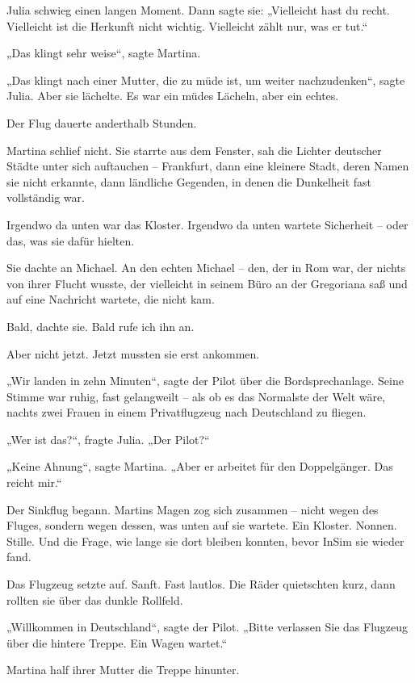 \documentclass[
]{article}
\begin{document}
Julia schwieg einen langen Moment. Dann sagte sie: „Vielleicht hast du recht. Vielleicht ist die Herkunft nicht wichtig. Vielleicht zählt nur, was er tut.``

„Das klingt sehr weise``, sagte Martina.

„Das klingt nach einer Mutter, die zu müde ist, um weiter nachzudenken``, sagte Julia. Aber sie lächelte. Es war ein müdes Lächeln, aber ein echtes.

Der Flug dauerte anderthalb Stunden.

Martina schlief nicht. Sie starrte aus dem Fenster, sah die Lichter deutscher Städte unter sich auftauchen -- Frankfurt, dann eine kleinere Stadt, deren Namen sie nicht erkannte, dann ländliche Gegenden, in denen die Dunkelheit fast vollständig war.

Irgendwo da unten war das Kloster. Irgendwo da unten wartete Sicherheit -- oder das, was sie dafür hielten.

Sie dachte an Michael. An den echten Michael -- den, der in Rom war, der nichts von ihrer Flucht wusste, der vielleicht in seinem Büro an der Gregoriana saß und auf eine Nachricht wartete, die nicht kam.

Bald, dachte sie. Bald rufe ich ihn an.

Aber nicht jetzt. Jetzt mussten sie erst ankommen.

„Wir landen in zehn Minuten``, sagte der Pilot über die Bordsprechanlage. Seine Stimme war ruhig, fast gelangweilt -- als ob es das Normalste der Welt wäre, nachts zwei Frauen in einem Privatflugzeug nach Deutschland zu fliegen.

„Wer ist das?{\kern0pt}``, fragte Julia. „Der Pilot?{\kern0pt}``

„Keine Ahnung``, sagte Martina. „Aber er arbeitet für den Doppelgänger. Das reicht mir.``

Der Sinkflug begann. Martins Magen zog sich zusammen -- nicht wegen des Fluges, sondern wegen dessen, was unten auf sie wartete. Ein Kloster. Nonnen. Stille. Und die Frage, wie lange sie dort bleiben konnten, bevor InSim sie wieder fand.

Das Flugzeug setzte auf. Sanft. Fast lautlos. Die Räder quietschten kurz, dann rollten sie über das dunkle Rollfeld.

„Willkommen in Deutschland``, sagte der Pilot. „Bitte verlassen Sie das Flugzeug über die hintere Treppe. Ein Wagen wartet.``

Martina half ihrer Mutter die Treppe hinunter.
\end{document}
